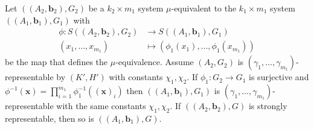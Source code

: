  \begin {proposition} 
  \label {p.mu-equivalent_1} Let $((A_2,\mathbf {b}_2),G_2)$ be a $k_2\times m_1$ system $\mu $-equivalent to the $k_1\times m_1$ system $((A_1,\mathbf {b}_1),G_1)$ with \begin {align} \phi :S((A_2,\mathbf {b}_2),G_2)&\longrightarrow S((A_1,\mathbf {b}_1),G_1) \nonumber \\ (x_1,\ldots ,x_{m_1}) &\longmapsto \left (\phi _1(x_{1}),\ldots ,\phi _1(x_{m_1})\right ) \nonumber \end {align} be the map that defines the $\mu $-equivalence. Assume $(A_2,G_2)$ is $(\gamma _1,\ldots ,\gamma _{m_1})$-representable by $(K',H')$ with constants $\chi _1,\chi _2$. If $\phi _1:G_2\to G_1$ is surjective and $\phi ^{-1}(\mathbf {x})=\prod _{i=1}^{m_1} \phi _1^{-1}((\mathbf {x})_i)$ then $((A_1,\mathbf {b}_1),G_1)$ is $(\gamma _{1},\ldots ,\gamma _{m_1})$-representable with the same constants $\chi _1,\chi _2$. If $((A_2,\mathbf {b}_2),G)$ is strongly representable, then so is $((A_1,\mathbf {b}_1),G)$.
 \end {proposition} 
 
